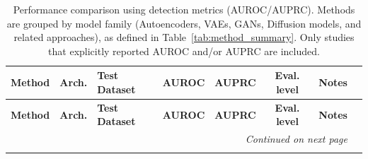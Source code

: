 \begin{longtable}{lp{1.2cm}lccccp{4.5cm}}
\caption{Performance comparison using detection metrics (AUROC/AUPRC).
Methods are grouped by model family (Autoencoders, VAEs, GANs, Diffusion models,
and related approaches), as defined in Table~\ref{tab:method_summary}.
Only studies that explicitly reported AUROC and/or AUPRC are included.}
\label{tab:detection_metrics}
\\
\toprule
\textbf{Method} & \textbf{Arch.} & \textbf{Test Dataset} & \textbf{AUROC} & \textbf{AUPRC} & \textbf{Eval. level} & \textbf{Notes} \\
\midrule
\endfirsthead
\toprule
\textbf{Method} & \textbf{Arch.} & \textbf{Test Dataset} & \textbf{AUROC} & \textbf{AUPRC} & \textbf{Eval. level} & \textbf{Notes} \\
\midrule
\endhead
\midrule
\multicolumn{7}{r}{\textit{Continued on next page}} \\
\midrule
\endfoot
\bottomrule
\endlastfoot


\end{longtable}
